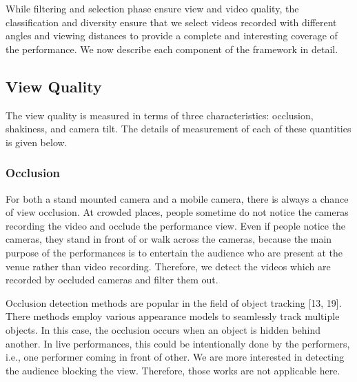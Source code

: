 \documentclass{clsfile}
\begin{document}
While filtering and selection phase ensure view and video quality,
the classification and diversity ensure that we select videos
recorded with different angles and viewing distances to provide a
complete and interesting coverage of the performance. We now
describe each component of the framework in detail.
\subsection{View Quality}
The view quality is measured in terms of three characteristics:
occlusion, shakiness, and camera tilt. The details of measurement
of each of these quantities is given below.
\subsubsection{Occlusion}
For both a stand mounted camera and a mobile camera, there
is always a chance of view occlusion. At crowded places, people
sometime do not notice the cameras recording the video and occlude
the performance view. Even if people notice the cameras,
they stand in front of or walk across the cameras, because the main
purpose of the performances is to entertain the audience who are
present at the venue rather than video recording. Therefore, we detect
the videos which are recorded by occluded cameras and filter
them out.

Occlusion detection methods are popular in the field of object
tracking [13, 19]. There methods employ various appearance models
to seamlessly track multiple objects. In this case, the occlusion
occurs when an object is hidden behind another. In live performances,
this could be intentionally done by the performers, i.e.,
one performer coming in front of other. We are more interested in
detecting the audience blocking the view. Therefore, those works
are not applicable here.
\end{document}

